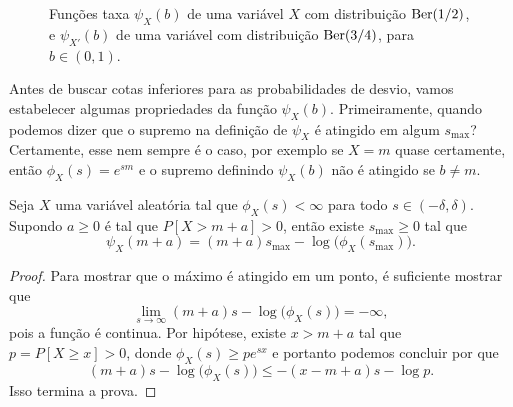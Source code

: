 \begin{figure}[!ht]
  \centering
  \caption{Funções taxa $\psi_{X}(b)$ de uma variável $X$ com distribuição $\operatorname{Ber}(1/2)$, e $\psi_{X'}(b)$ de uma variável com distribuição $\operatorname{Ber}(3/4)$, para $b \in (0,1)$.}
\end{figure}

Antes de buscar cotas inferiores para as probabilidades de desvio, vamos estabelecer algumas propriedades da função $\psi_X(b)$.
Primeiramente, quando podemos dizer que o supremo na definição de $\psi_X$ é atingido em algum $s_{\text{max}}$?
Certamente, esse nem sempre é o caso, por exemplo se $X = m$ quase certamente, então $\phi_X(s) = e^{sm}$ e o supremo definindo $\psi_X(b)$ não é atingido se $b \neq m$.

\begin{lemma}
  \label{l:smax_PGD}
  Seja $X$ uma variável aleatória tal que $\phi_X(s) < \infty$ para todo $s \in (-\delta, \delta)$.
  Supondo $a \geq 0$ é tal que $P[X > m + a] > 0$, então existe $s_{\text{max}} \geq 0$ tal que
  \begin{equation}
    \psi_X(m + a) = (m + a)s_{\text{max}} - \log\big(\phi_X(s_\text{max})\big).
  \end{equation}
\end{lemma}

\begin{proof}
Para mostrar que o máximo é atingido em um ponto, é suficiente mostrar que
\begin{equation}
  \lim_{s\to \infty} (m + a)s - \log\big(\phi_X(s)\big) = -\infty,
\end{equation}
pois a função é continua.
Por hipótese, existe $x > m + a$ tal que $p = P[X \geq x] > 0$, donde $\phi_X(s) \geq p e^{sx}$ e portanto podemos concluir por que
$$(m + a)s - \log\big(\phi_X(s)\big) \leq -(x - m + a)s - \log p.$$
Isso termina a prova.
\end{proof}

